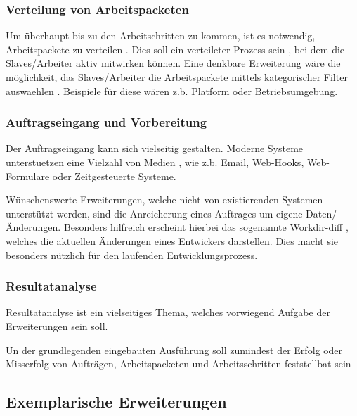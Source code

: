 \subsubsection{Verteilung von Arbeitspacketen}

Um \"uberhaupt bis zu den Arbeitschritten zu kommen,
ist es notwendig, Arbeitspackete zu verteilen .
Dies soll ein verteileter Prozess sein ,
bei dem die Slaves/Arbeiter aktiv mitwirken k\"onnen.
Eine denkbare Erweiterung w\"are die m\"oglichkeit, das Slaves/Arbeiter
die Arbeitspackete mittels kategorischer Filter auswaehlen .
Beispiele f\"ur diese w\"aren z.b. Platform oder Betriebsumgebung.

\subsubsection{Auftragseingang und Vorbereitung}


Der Auftragseingang kann sich vielseitig gestalten.
Moderne Systeme unterstuetzen eine Vielzahl von Medien ,
wie z.b. Email, Web-Hooks, Web-Formulare oder Zeitgesteuerte Systeme.

W\"unschenswerte Erweiterungen, welche nicht von existierenden Systemen unterst\"utzt werden,
sind die Anreicherung eines Auftrages um eigene Daten/\"Anderungen.
Besonders hilfreich erscheint hierbei das sogenannte Workdir-diff ,
welches die aktuellen \"Anderungen eines Entwickers darstellen.
Dies macht sie besonders n\"utzlich f\"ur den laufenden Entwicklungsprozess.

\subsubsection{Resultatanalyse}

Resultatanalyse ist ein vielseitiges Thema,
welches vorwiegend Aufgabe der Erweiterungen sein soll.

Un der grundlegenden eingebauten Ausf\"uhrung soll zumindest der Erfolg oder Misserfolg
von Auftr\"agen, Arbeitspacketen und Arbeitsschritten feststellbat sein 


\subsection{Exemplarische Erweiterungen}

